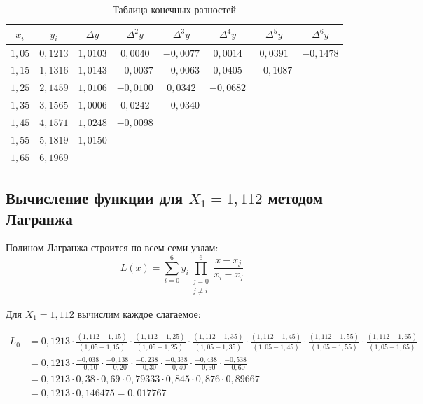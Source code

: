 \begin{table}[h!]
\centering
\label{tab:diff}
\renewcommand{\arraystretch}{1.5}
\begin{tabular}{|c|c|c|c|c|c|c|c|}
\hline
$x_i$ & $y_i$ & $\Delta y$ & $\Delta^2 y$ & $\Delta^3 y$ & $\Delta^4 y$ & $\Delta^5 y$ & $\Delta^6 y$ \\
\hline
$1{,}05$ & $0{,}1213$ & $1{,}0103$ & $0{,}0040$ & $-0{,}0077$ & $0{,}0014$ & $0{,}0391$ & $-0{,}1478$ \\
$1{,}15$ & $1{,}1316$ & $1{,}0143$ & $-0{,}0037$ & $-0{,}0063$ & $0{,}0405$ & $-0{,}1087$ & \\
$1{,}25$ & $2{,}1459$ & $1{,}0106$ & $-0{,}0100$ & $0{,}0342$ & $-0{,}0682$ & & \\
$1{,}35$ & $3{,}1565$ & $1{,}0006$ & $0{,}0242$ & $-0{,}0340$ & & & \\
$1{,}45$ & $4{,}1571$ & $1{,}0248$ & $-0{,}0098$ & & & & \\
$1{,}55$ & $5{,}1819$ & $1{,}0150$ & & & & & \\
$1{,}65$ & $6{,}1969$ & & & & & & \\
\hline
\end{tabular}
\caption{Таблица конечных разностей}
\end{table}

\newpage
\subsection{Вычисление функции для $X_1 = 1{,}112$ методом Лагранжа}

Полином Лагранжа строится по всем семи узлам:
\[
L(x) = \sum_{i=0}^{6} y_i \prod_{\substack{j=0 \\ j \neq i}}^{6} \frac{x - x_j}{x_i - x_j}
\]

Для $X_1 = 1{,}112$ вычислим каждое слагаемое:

\begin{align*}
L_0 &= 0{,}1213 \cdot \frac{(1{,}112-1{,}15)}{(1{,}05-1{,}15)} \cdot \frac{(1{,}112-1{,}25)}{(1{,}05-1{,}25)} \cdot \frac{(1{,}112-1{,}35)}{(1{,}05-1{,}35)} \cdot \frac{(1{,}112-1{,}45)}{(1{,}05-1{,}45)} \cdot \frac{(1{,}112-1{,}55)}{(1{,}05-1{,}55)} \cdot \frac{(1{,}112-1{,}65)}{(1{,}05-1{,}65)} \\
&= 0{,}1213 \cdot \frac{-0{,}038}{-0{,}10} \cdot \frac{-0{,}138}{-0{,}20} \cdot \frac{-0{,}238}{-0{,}30} \cdot \frac{-0{,}338}{-0{,}40} \cdot \frac{-0{,}438}{-0{,}50} \cdot \frac{-0{,}538}{-0{,}60} \\
&= 0{,}1213 \cdot 0{,}38 \cdot 0{,}69 \cdot 0{,}79333 \cdot 0{,}845 \cdot 0{,}876 \cdot 0{,}89667 \\
&= 0{,}1213 \cdot 0{,}146475 = 0{,}017767
\end{align*}

